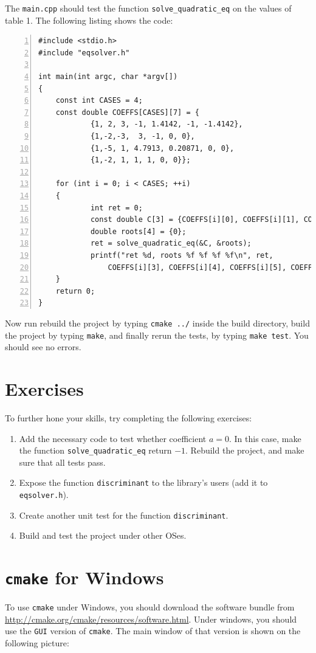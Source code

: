 \documentclass[12pt,a4paper]{article}
\begin{document}
The \verb+main.cpp+ should test the function \verb+solve_quadratic_eq+ on the values of table 1. The following listing shows the code:
\begin{lstlisting}[basicstyle=\small, numbers=left,caption=main.cpp,columns=flexible,keywordstyle=\color{black}\ttfamily]
#include <stdio.h>
#include "eqsolver.h"

int main(int argc, char *argv[])
{
	const int CASES = 4;
	const double COEFFS[CASES][7] = {
			{1, 2, 3, -1, 1.4142, -1, -1.4142},
			{1,-2,-3,  3, -1, 0, 0},
			{1,-5, 1, 4.7913, 0.20871, 0, 0},
			{1,-2, 1, 1, 1, 0, 0}};

	for (int i = 0; i < CASES; ++i)
	{
			int ret = 0;
			const double C[3] = {COEFFS[i][0], COEFFS[i][1], COEFFS[i][2]};
			double roots[4] = {0};
			ret = solve_quadratic_eq(&C, &roots);
			printf("ret %d, roots %f %f %f %f\n", ret, 
				COEFFS[i][3], COEFFS[i][4], COEFFS[i][5], COEFFS[i][6]);
	}
	return 0;
}
\end{lstlisting}

Now run rebuild the project by typing \verb+cmake ../+ inside the build directory, build the project by typing \verb+make+, and finally rerun the tests, by typing \verb+make test+. You should see no errors.
\section{Exercises}
To further hone your skills, try completing the following exercises:
\begin{enumerate}
\item Add the necessary code to test whether coefficient $a=0$. In this case, make the function \verb+solve_quadratic_eq+ return $-1$. Rebuild the project, and make sure that all tests pass.
\item Expose the function \verb+discriminant+ to the library's users (add it to \verb+eqsolver.h+).
\item Create another unit test for the function \verb+discriminant+. 
\item Build and test the project under other OSes. 
\end{enumerate}

\section{\texttt{cmake} for Windows}
To use \verb+cmake+ under Windows, you should download the software bundle from \href{http://cmake.org/cmake/resources/software.html}{http://cmake.org/cmake/resources/software.html}. Under windows, you should use the \verb+GUI+ version of \verb+cmake+. The main window of that version is shown on the following picture:
\end{document}
